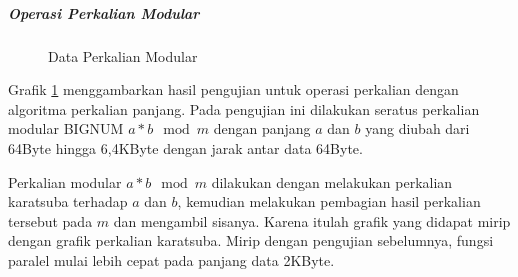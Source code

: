     \subparagraph{Operasi Perkalian Modular}
    \begin{figure}[h]
      \centering
      \caption{Data Perkalian Modular}
      \label{fig:data_modmul}
    \end{figure}

    Grafik \ref{fig:data_modmul} menggambarkan hasil pengujian untuk operasi perkalian dengan algoritma perkalian panjang. Pada pengujian ini dilakukan seratus perkalian modular BIGNUM $a*b \mod m$ dengan panjang $a$ dan $b$ yang diubah dari 64Byte hingga 6,4KByte dengan jarak antar data 64Byte.

    Perkalian modular $a*b \mod m$ dilakukan dengan melakukan perkalian karatsuba terhadap $a$ dan $b$, kemudian melakukan pembagian hasil perkalian tersebut pada $m$ dan mengambil sisanya. Karena itulah grafik yang didapat mirip dengan grafik perkalian karatsuba. Mirip dengan pengujian sebelumnya, fungsi paralel mulai lebih cepat pada panjang data 2KByte.


